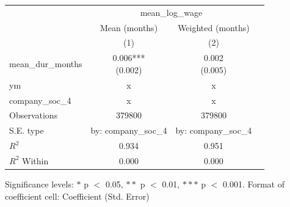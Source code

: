 \renewcommand\cellalign{t}
\begin{threeparttable}
\begin{tabular}{lccc}
\toprule
 & \multicolumn{2}{c}{mean_log_wage} \\
\cmidrule(lr){2-3} 
 & Mean (months) & Weighted (months) \\
 & (1) & (2) \\
\midrule
\addlinespace
mean_dur_months & \makecell{0.006*** \\ (0.002)} & \makecell{0.002 \\ (0.005)} \\
\midrule
\addlinespace
ym & x & x \\
company_soc_4 & x & x \\
\midrule
\addlinespace
Observations & 379800 & 379800 \\
S.E. type & by: company_soc_4 & by: company_soc_4 \\
$R^2$ & 0.934 & 0.951 \\
$R^2$ Within & 0.000 & 0.000 \\
\bottomrule
\end{tabular}
\footnotesize Significance levels: $*$ p $<$ 0.05, $**$ p $<$ 0.01, $***$ p $<$ 0.001. Format of coefficient cell: Coefficient 
 (Std. Error)
\end{threeparttable}